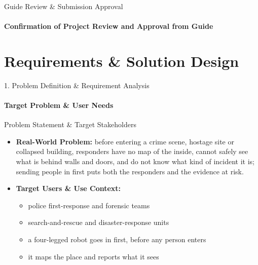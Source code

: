 \documentclass[aspectratio=169, 11pt]{beamer}
\begin{document}
\begin{frame}{Guide Review \& Submission Approval}
    \framesubtitle{Confirmation of Project Review and Approval from Guide}
    \centering
\end{frame}

\section{Requirements \& Solution Design}

\begin{frame}{1. Problem Definition \& Requirement Analysis}
    \framesubtitle{Target Problem \& User Needs}
    \begin{block}{Problem Statement \& Target Stakeholders}
        \small
        \begin{itemize}
            \item \textbf{Real-World Problem:} before entering a crime scene, hostage site or collapsed building, responders have no map of the inside, cannot safely see what is behind walls and doors, and do not know what kind of incident it is; sending people in first puts both the responders and the evidence at risk.
            \item \textbf{Target Users \& Use Context:}
            \begin{itemize}
                \item police first-response and forensic teams
                \item search-and-rescue and disaster-response units
                \item a four-legged robot goes in first, before any person enters
                \item it maps the place and reports what it sees
            \end{itemize}
        \end{itemize}
    \end{block}
\end{frame}
\end{document}
